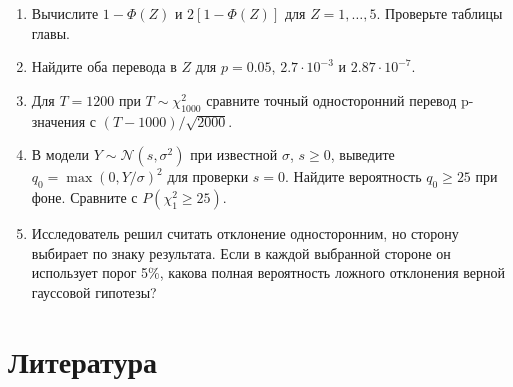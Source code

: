 \documentclass[
  russian,
  11pt,
  a4paper,
  open=any]{scrbook}
\providecommand{\tightlist}{%
  \setlength{\itemsep}{0pt}\setlength{\parskip}{0pt}}
\begin{document}
\begin{semanticpdfbox}[colback=BookCoralSoft,borderline west={1.2mm}{0pt}{BookCoral}]

\par\nopagebreak[4]\vspace{1.2mm}

\begin{enumerate}
\def\labelenumi{\arabic{enumi}.}
\tightlist
\item
  Вычислите \(1-\Phi(Z)\) и \(2[1-\Phi(Z)]\) для \(Z=1,\ldots,5\).
  Проверьте таблицы главы.
\item
  Найдите оба перевода в \(Z\) для \(p=0.05\), \(2.7\cdot10^{-3}\) и
  \(2.87\cdot10^{-7}\).
\item
  Для \(T=1200\) при \(T\sim\chi^2_{1000}\) сравните точный
  односторонний перевод p-значения с \((T-1000)/\sqrt{2000}\).
\item
  В модели \(Y\sim\mathcal N(s,\sigma^2)\) при известной \(\sigma\),
  \(s\ge0\), выведите \(q_0=\max(0,Y/\sigma)^2\) для проверки \(s=0\).
  Найдите вероятность \(q_0\ge25\) при фоне. Сравните с
  \(P(\chi^2_1\ge25)\).
\item
  Исследователь решил считать отклонение односторонним, но сторону
  выбирает по знаку результата. Если в каждой выбранной стороне он
  использует порог 5\%, какова полная вероятность ложного отклонения
  верной гауссовой гипотезы?
\end{enumerate}

\end{semanticpdfbox}

\section*{Литература}\label{ux43bux438ux442ux435ux440ux430ux442ux443ux440ux430-12}

\end{document}
